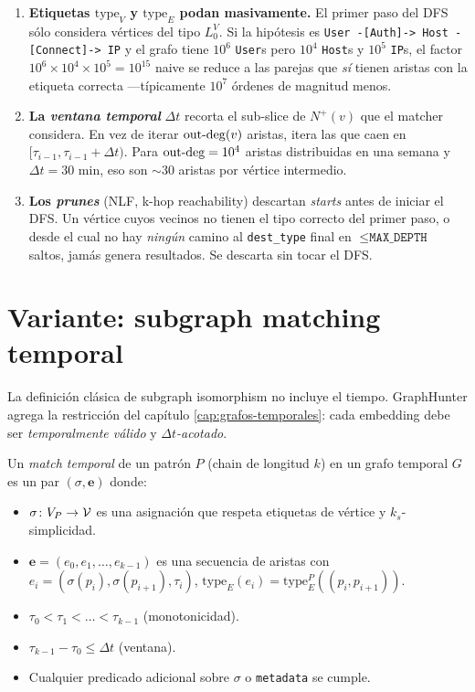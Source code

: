 \begin{enumerate}
    \item \textbf{Etiquetas \(\mathrm{type}_V\) y \(\mathrm{type}_E\)
    podan masivamente.} El primer paso del DFS sólo considera
    vértices del tipo \(L_0^V\). Si la hipótesis es
    \texttt{User -[Auth]-> Host -[Connect]-> IP} y el grafo tiene
    \(10^6\) \texttt{User}s pero \(10^4\) \texttt{Host}s y \(10^5\)
    \texttt{IP}s, el factor \(10^6 \times 10^4 \times 10^5 = 10^{15}\)
    naive se reduce a las parejas que \emph{sí} tienen aristas con la
    etiqueta correcta ---típicamente \(10^7\) órdenes de magnitud
    menos.
    \item \textbf{La \emph{ventana temporal}} \(\Delta t\) recorta el
    sub-slice de \(N^{+}(v)\) que el matcher considera. En vez de
    iterar \(\mathrm{out\text{-}deg}(v)\) aristas, itera las que caen en
    \([\tau_{i-1}, \tau_{i-1} + \Delta t)\). Para \(\mathrm{out\text{-}deg} = 10^4\)
    aristas distribuidas en una semana y \(\Delta t = 30\) min,
    eso son \(\sim 30\) aristas por vértice intermedio.
    \item \textbf{Los \emph{prunes}} (NLF, k-hop reachability)
    descartan \emph{starts} antes de iniciar el DFS. Un vértice
    cuyos vecinos no tienen el tipo correcto del primer paso, o
    desde el cual no hay \emph{ningún} camino al \texttt{dest\_type}
    final en \(\leq \texttt{MAX\_DEPTH}\) saltos, jamás genera
    resultados. Se descarta sin tocar el DFS.
\end{enumerate}

\section{Variante: subgraph matching temporal}

La definición clásica de subgraph isomorphism no incluye el tiempo.
GraphHunter agrega la restricción del capítulo
\ref{cap:grafos-temporales}: cada embedding debe ser \emph{temporalmente
válido} y \emph{\(\Delta t\)-acotado}.

\begin{definition}
Un \emph{match temporal} de un patrón \(P\) (chain de longitud \(k\))
en un grafo temporal \(G\) es un par \((\sigma, \mathbf{e})\) donde:
\begin{itemize}
    \item \(\sigma \colon V_P \to \mathcal{V}\) es una asignación que respeta
    etiquetas de vértice y \(k_s\)-simplicidad.
    \item \(\mathbf{e} = (e_0, e_1, \dots, e_{k-1})\) es una secuencia
    de aristas con \(e_i = (\sigma(p_i), \sigma(p_{i+1}), \tau_i)\),
    \(\mathrm{type}_E(e_i) = \mathrm{type}_E^P((p_i, p_{i+1}))\).
    \item \(\tau_0 < \tau_1 < \dots < \tau_{k-1}\) (monotonicidad).
    \item \(\tau_{k-1} - \tau_0 \leq \Delta t\) (ventana).
    \item Cualquier predicado adicional sobre \(\sigma\) o
    \texttt{metadata} se cumple.
\end{itemize}
\end{definition}

